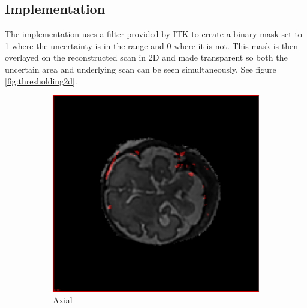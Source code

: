\subsection*{Implementation}
The implementation uses a filter provided by ITK to create a binary mask set to 1 where the uncertainty is in the range and 0 where it is not. This mask is then overlayed on the reconstructed scan in 2D and made transparent so both the uncertain area and underlying scan can be seen simultaneously. See figure \ref{fig:thresholding2d}.

\begin{figure}[H]
  \centering
  \begin{subfigure}[b]{0.3\textwidth}
    \includegraphics[width=\textwidth]{images/thresholding/thresholding_2d_axial.png}
    \caption{Axial}
    \label{fig:thresholding2daxial}
  \end{subfigure}%
  ~ %
  \begin{subfigure}[b]{0.3\textwidth}

\end{subfigure}
\end{figure}
